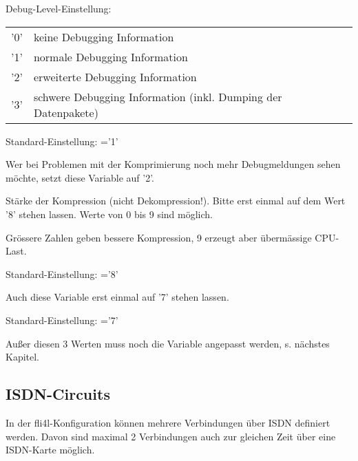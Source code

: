 \begin{description}


  Debug-Level-Einstellung:

  \begin{tabular}[h!]{ll}
    '0' & keine Debugging Information \\
    '1' & normale Debugging Information\\
    '2' & erweiterte Debugging Information\\
    '3' & schwere Debugging Information (inkl. Dumping der Datenpakete)\\
  \end{tabular}

  Standard-Einstellung: ='1'
  
  Wer bei Problemen mit der Komprimierung noch mehr Debugmeldungen
  sehen möchte, setzt diese Variable auf '2'.


  
  Stärke der Kompression (nicht Dekompression!). Bitte erst einmal auf
  dem Wert '8' stehen lassen. Werte von 0 bis 9 sind möglich.
  
  Grössere Zahlen geben bessere Kompression, 9 erzeugt aber
  übermässige CPU-Last.
  
  Standard-Einstellung: ='8'


  Auch diese Variable erst einmal auf '7' stehen lassen.

  Standard-Einstellung: ='7'
  
  Außer diesen 3 Werten muss noch die Variable
   angepasst werden, s. nächstes Kapitel.

\end{description}




\subsection{ISDN-Circuits}

In der fli4l-Konfiguration können mehrere Verbindungen über ISDN
definiert werden. Davon sind maximal 2 Verbindungen auch zur gleichen
Zeit über eine ISDN-Karte möglich.

